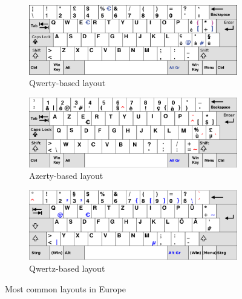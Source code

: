 \begin{figure}[H]
    \centering
    \begin{subfigure}[b]{0.3\textwidth}
        \includegraphics[width=\textwidth]{images/qwerty.png}
        \caption{Qwerty-based layout}
    \end{subfigure}
	 \begin{subfigure}[b]{0.3\textwidth}
        \includegraphics[width=\textwidth]{images/azerty.png}
        \caption{Azerty-based layout}
    \end{subfigure} 
    \begin{subfigure}[b]{0.3\textwidth}
        \includegraphics[width=\textwidth]{images/qwertz.png}
        \caption{Qwertz-based layout}
    \end{subfigure}
    \caption{Most common layouts in Europe}
\end{figure}
\clearpage

